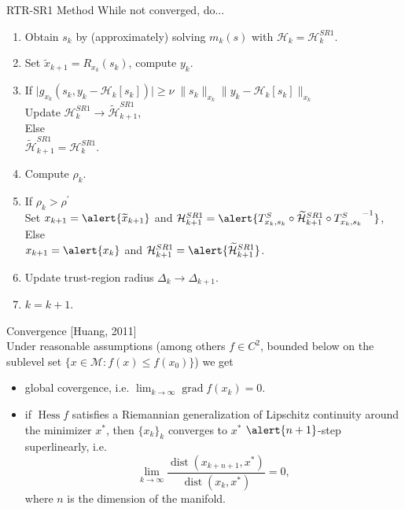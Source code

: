 \documentclass{beamer}
\begin{document}
\begin{frame}{RTR-SR1 Method}
    While not converged, do... 

    \begin{enumerate}
        \item Obtain $s_k$ by (approximately) solving $m_k(s)$ with $\mathcal{H}_k = \mathcal{H}^{SR1}_k$.
        \item Set $\widetilde{x}_{k+1} = R_{x_k}(s_k)$, compute $y_k$.
        \item If $\lvert g_{x_k}(s_k, y_k - \mathcal{H}_k[s_k]) \rvert \geq \nu \; \lVert s_k \rVert_{x_k} \lVert y_k - \mathcal{H}_k[s_k] \rVert_{x_k}$ \\
        \hspace{10mm} Update $\mathcal{H}^{SR1}_k \rightarrow \widetilde{\mathcal{H}}^{SR1}_{k+1}$, \\
        Else \\
        \hspace{10mm} $\widetilde{\mathcal{H}}^{SR1}_{k+1} = \mathcal{H}^{SR1}_{k}$. 
        \item Compute $\rho_k$.
        \item If $\rho_k > \rho^{\prime}$ \\
        \hspace{10mm} Set $x_{k+1} = \alert{\widetilde{x}_{k+1}}$ and $\mathcal{H}^{SR1}_{k+1} = \alert{T^{S}_{x_k, s_k} \circ \widetilde{\mathcal{H}}^{SR1}_{k+1} \circ  {T^{S}_{x_k, s_k}}^{-1}}$, \\
        Else \\
        \hspace{10mm} $x_{k+1} = \alert{x_k}$ and $\mathcal{H}^{SR1}_{k+1} = \alert{\widetilde{\mathcal{H}}^{SR1}_{k+1}}$.
        \item Update trust-region radius $\Delta_k \rightarrow \Delta_{k+1}$.
        \item $k = k+1$.
    \end{enumerate}
\end{frame}

\begin{frame}{Convergence}
    \vspace{-1\baselineskip}\hfill{\tiny{[Huang, 2011]}} \\[0.2\baselineskip]
    Under reasonable assumptions (among others $f \in C^2$, bounded below on the sublevel set $\{ x \in \mathcal{M} \colon f(x) \leq f(x_0) \}$) we get 
    \begin{itemize}
        \item \alert{global covergence}, i.e. $\lim_{k \rightarrow \infty} \operatorname{grad} f(x_k) = 0$.
        \item if $\operatorname{Hess} f$ satisfies a Riemannian generalization of Lipschitz continuity around the minimizer $x^*$, then $\{ x_k \}_k$ converges to $x^*$ $\alert{n + 1}$\alert{-step superlinearly}, i.e. \begin{equation*}\lim_{k \rightarrow \infty} \frac{\operatorname{dist}(x_{k+n+1}, x^*)}{\operatorname{dist}(x_k, x^*)} = 0, \end{equation*} where $n$ is the dimension of the manifold.
    \end{itemize}
\end{frame}
\end{document}
